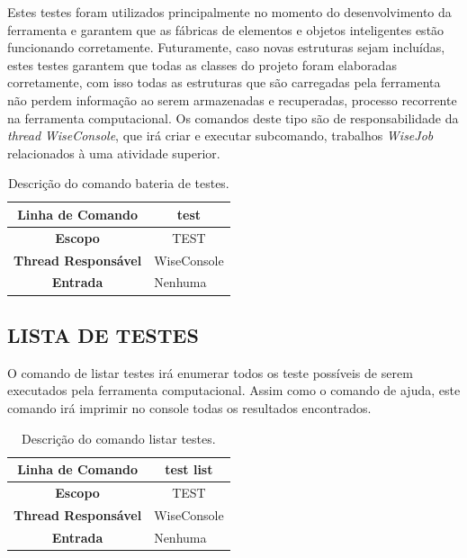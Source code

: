 Estes testes foram utilizados principalmente no momento do desenvolvimento da ferramenta e garantem que as fábricas de elementos e objetos inteligentes estão funcionando corretamente. Futuramente, caso novas estruturas sejam incluídas, estes testes garantem que todas as classes do projeto foram elaboradas corretamente, com isso todas as estruturas que são carregadas pela ferramenta não perdem informação ao serem armazenadas e recuperadas, processo recorrente na ferramenta computacional. Os comandos deste tipo são de responsabilidade da \textit{thread} \textit{WiseConsole}, que irá criar e executar subcomando, trabalhos \textit{WiseJob} relacionados à uma atividade superior.

\begin{center}
	\begin{table}[!htbp]
		\begin{tabularx}{\textwidth}{c|X}
			\toprule
			\textbf{Linha de Comando} & \multicolumn{1}{c}{test} \\
			\midrule
			\textbf{Escopo} & \multicolumn{1}{c}{TEST} \\
			\hline
			\textbf{Thread Responsável} & \multicolumn{1}{c}{WiseConsole} \\
			\hline
			\textbf{Entrada} & Nenhuma \\
			\bottomrule
		\end{tabularx}
		\caption{Descrição do comando bateria de testes.}
		\label{tab:test}
	\end{table}
\end{center}

\subsection{LISTA DE TESTES}\label{sec:test list}

O comando de listar testes irá enumerar todos os teste possíveis de serem executados pela ferramenta computacional. Assim como o comando de ajuda, este comando irá imprimir no console todas os resultados encontrados.

\begin{center}
	\begin{table}[!htbp]
		\begin{tabularx}{\textwidth}{c|X}
			\toprule
			\textbf{Linha de Comando} & \multicolumn{1}{c}{test list} \\
			\midrule
			\textbf{Escopo} & \multicolumn{1}{c}{TEST} \\
			\hline
			\textbf{Thread Responsável} & \multicolumn{1}{c}{WiseConsole} \\
			\hline
			\textbf{Entrada} & Nenhuma \\
			\bottomrule
		\end{tabularx}
		\caption{Descrição do comando listar testes.}
		\label{tab:list_test}
	\end{table}
\end{center}

